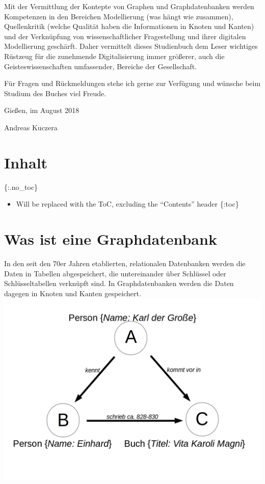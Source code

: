 \documentclass[ngerman,]{scrreprt}
\providecommand{\tightlist}{%
  \setlength{\itemsep}{0pt}\setlength{\parskip}{0pt}}
\begin{document}
Mit der Vermittlung der Kontepte von Graphen und Graphdatenbanken werden Kompetenzen in den Bereichen Modellierung (was hängt wie zusammen), Quellenkritik (welche Qualität haben die Informationen in Knoten und Kanten) und der Verknüpfung von wissenschaftlicher Fragestellung und ihrer digitalen Modellierung geschärft. Daher vermittelt dieses Studienbuch dem Leser wichtiges Rüstzeug für die zunehmende Digitalisierung immer größerer, auch die Geisteswissenschaften umfassender, Bereiche der Gesellschaft.

Für Fragen und Rückmeldungen stehe ich gerne zur Verfügung und wünsche beim Studium des Buches viel Freude.

Gießen, im August 2018

Andreas Kuczera

\chapter{Inhalt}\label{inhalt}

\{:.no\_toc\}

\begin{itemize}
\tightlist
\item
  Will be replaced with the ToC, excluding the ``Contents'' header \{:toc\}
\end{itemize}

\chapter{Was ist eine Graphdatenbank}\label{was-ist-eine-graphdatenbank}

In den seit den 70er Jahren etablierten, relationalen Datenbanken werden die Daten in Tabellen abgespeichert, die untereinander über Schlüssel oder Schlüsseltabellen verknüpft sind. In Graphdatenbanken werden die Daten dagegen in Knoten und Kanten gespeichert. \includegraphics{Bilder/Beispielgraph.png}
\end{document}
